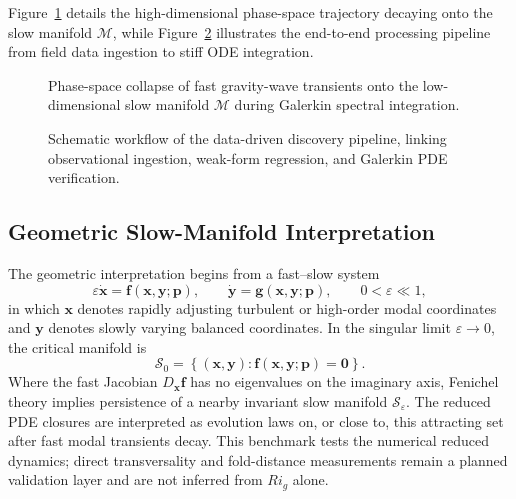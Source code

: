 \documentclass[11pt,a4paper]{article}
\begin{document}
Figure~\ref{fig:slow_manifold} details the high-dimensional phase-space trajectory decaying onto the slow manifold $\mathcal{M}$, while Figure~\ref{fig:wsindy_architecture} illustrates the end-to-end processing pipeline from field data ingestion to stiff ODE integration.

\begin{figure}[H]
    \centering
    \resizebox{0.82\linewidth}{!}{}
    \caption{Phase-space collapse of fast gravity-wave transients onto the low-dimensional slow manifold $\mathcal{M}$ during Galerkin spectral integration.}
    \label{fig:slow_manifold}
\end{figure}

\begin{figure}[H]
    \centering
    \resizebox{0.92\linewidth}{!}{}
    \caption{Schematic workflow of the data-driven discovery pipeline, linking observational ingestion, weak-form regression, and Galerkin PDE verification.}
    \label{fig:wsindy_architecture}
\end{figure}

\subsection{Geometric Slow-Manifold Interpretation}

The geometric interpretation begins from a fast--slow system
\begin{equation}
    \varepsilon \dot{\mathbf{x}} = \mathbf{f}(\mathbf{x},\mathbf{y};\mathbf{p}),
    \qquad
    \dot{\mathbf{y}} = \mathbf{g}(\mathbf{x},\mathbf{y};\mathbf{p}),
    \qquad 0 < \varepsilon \ll 1,
\end{equation}
in which $\mathbf{x}$ denotes rapidly adjusting turbulent or high-order modal coordinates and $\mathbf{y}$ denotes slowly varying balanced coordinates. In the singular limit $\varepsilon \to 0$, the critical manifold is
\begin{equation}
    \mathcal{S}_0 = \left\{(\mathbf{x},\mathbf{y}) : \mathbf{f}(\mathbf{x},\mathbf{y};\mathbf{p}) = \mathbf{0}\right\}.
\end{equation}
Where the fast Jacobian $D_{\mathbf{x}}\mathbf{f}$ has no eigenvalues on the imaginary axis, Fenichel theory implies persistence of a nearby invariant slow manifold $\mathcal{S}_{\varepsilon}$. The reduced PDE closures are interpreted as evolution laws on, or close to, this attracting set after fast modal transients decay. This benchmark tests the numerical reduced dynamics; direct transversality and fold-distance measurements remain a planned validation layer and are not inferred from $Ri_g$ alone.
\end{document}
